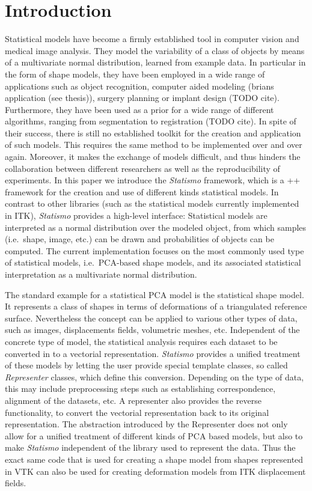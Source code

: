 \documentclass{InsightArticle}
\newcommand{\Statismo}{\emph{Statismo}\xspace}
\begin{document}
\tableofcontents

\section{Introduction}

Statistical models have become a firmly established tool in computer
vision and medical image analysis. 
They model the variability of a class of objects by means of a multivariate normal distribution, learned from example data. 
In particular in the form of shape
models, they have been employed in a wide range of applications such
as object recognition, computer aided modeling (brians application (see thesis)), surgery planning or implant design (TODO cite).
Furthermore, they have been used as a prior for a wide range of different algorithms, ranging from segmentation to
registration (TODO cite).  In spite of their success, there is still
no established toolkit for the creation and application of such
models. This requires the same method to be implemented over and over
again. Moreover, it makes the exchange of models difficult, and thus
hinders the collaboration between different researchers as well as the reproducibility of experiments.  In this paper we
introduce the \Statismo framework, which is a \C++ framework for the
creation and use of different kinds statistical
models.  In contrast to other libraries (such as the statistical
models currently implemented in ITK), \Statismo provides a high-level
interface: Statistical models are interpreted as a normal distribution
over the modeled object, from which samples (i.e.\ shape, image, etc.)
can be drawn and probabilities of objects can be computed.
The current implementation focuses on the most commonly used type of statistical models, i.e.\ PCA-based shape models, and its
associated statistical interpretation as a multivariate normal distribution. 

The standard example for a statistical PCA model is the statistical
shape model.  It represents a class of shapes in terms of deformations
of a triangulated reference surface. Nevertheless the concept can be
applied to various other types of data, such as images, displacements
fields, volumetric meshes, etc. Independent of the concrete type of
model, the statistical analysis requires each dataset to be converted
in to a vectorial representation.  \Statismo provides a unified
treatment of these models by letting the user provide special template
classes, so called \emph{Representer} classes, which define this
conversion.  Depending on the type of data, this may include
preprocessing steps such as establishing correspondence, alignment of
the datasets, etc.  A representer also provides the reverse
functionality, to convert the vectorial representation back to its
original representation.  The abstraction introduced by the
Representer does not only allow for a unified treatment of different
kinds of PCA based models, but also to make \Statismo independent of
the library used to represent the data. Thus the exact same code that
is used for creating a shape model from shapes represented in VTK can
also be used for creating deformation models from ITK displacement
fields.
\end{document}
